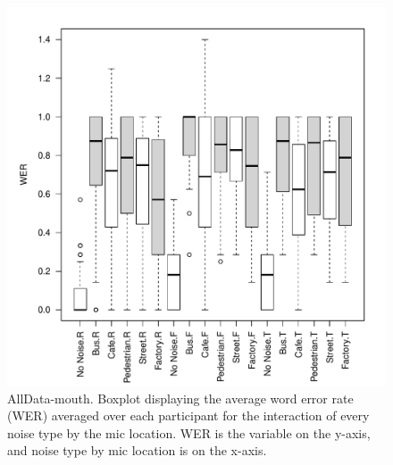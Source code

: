 \documentclass[dissertation,copyright]{uathesis}
\makeatletter
\def\maxwidth{ %
  \ifdim\Gin@nat@width>\linewidth
    \linewidth
  \else
    \Gin@nat@width
  \fi
}
\makeatother
\begin{document}
\begin{figure}

\includegraphics[width=\maxwidth]{figure/boxplot_noiseXmicXall_mouth-1} 

\caption{AllData-mouth. Boxplot displaying the average word error rate (WER) averaged over each participant for the interaction of every noise type by the mic location. WER is the variable on the y-axis, and noise type by mic location is on the x-axis.}
\label{fig:ALLXperc_noiseXmic_mouth_boxplot}
\end{figure}


\end{document}
